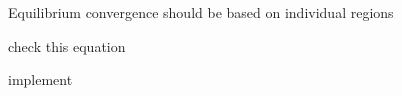 
\begin{DoxyRefList}
\item[\label{todo__todo000004}%
\hypertarget{todo__todo000004}{}%
Member \hyperlink{classIOSKJ_1_1Model_aa422925a07c078b87c5727a6a7c22d00}{I\-O\-S\-K\-J\-:\-:Model\-:\-:equilibrium} (void)]Equilibrium convergence should be based on individual regions  
\item[\label{todo__todo000002}%
\hypertarget{todo__todo000002}{}%
Member \hyperlink{classIOSKJ_1_1Model_af163ebda22001c7df308dc227c1687bb}{I\-O\-S\-K\-J\-:\-:Model\-:\-:step} (void)]check this equation 

implement 
\end{DoxyRefList}